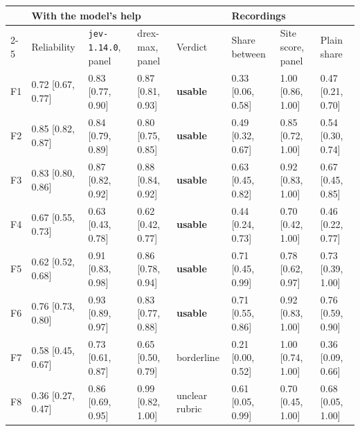 {\scriptsize\setlength{\tabcolsep}{3.2pt}
\begin{tabular}{@{}l l l l l l l l@{}}
\toprule
 & \multicolumn{4}{l}{With the model's help} & \multicolumn{3}{l}{Recordings} \\
\cmidrule(r){2-5}\cmidrule{6-8}
 & Reliability & \texttt{jev-1.14.0}, panel & drex-max, panel & Verdict & Share between & Site score, panel & Plain share \\
\midrule
F1 & 0.72 {\scriptsize[0.67, 0.77]} & 0.83 {\scriptsize[0.77, 0.90]} & 0.87 {\scriptsize[0.81, 0.93]} & \textbf{usable} & 0.33 {\scriptsize[0.06, 0.58]} & 1.00 {\scriptsize[0.86, 1.00]} & 0.47 {\scriptsize[0.21, 0.70]} \\
F2 & 0.85 {\scriptsize[0.82, 0.87]} & 0.84 {\scriptsize[0.79, 0.89]} & 0.80 {\scriptsize[0.75, 0.85]} & \textbf{usable} & 0.49 {\scriptsize[0.32, 0.67]} & 0.85 {\scriptsize[0.72, 1.00]} & 0.54 {\scriptsize[0.30, 0.74]} \\
F3 & 0.83 {\scriptsize[0.80, 0.86]} & 0.87 {\scriptsize[0.82, 0.92]} & 0.88 {\scriptsize[0.84, 0.92]} & \textbf{usable} & 0.63 {\scriptsize[0.45, 0.82]} & 0.92 {\scriptsize[0.83, 1.00]} & 0.67 {\scriptsize[0.45, 0.85]} \\
F4 & 0.67 {\scriptsize[0.55, 0.73]} & 0.63 {\scriptsize[0.43, 0.78]} & 0.62 {\scriptsize[0.42, 0.77]} & \textbf{usable} & 0.44 {\scriptsize[0.24, 0.73]} & 0.70 {\scriptsize[0.42, 1.00]} & 0.46 {\scriptsize[0.22, 0.77]} \\
F5 & 0.62 {\scriptsize[0.52, 0.68]} & 0.91 {\scriptsize[0.83, 0.98]} & 0.86 {\scriptsize[0.78, 0.94]} & \textbf{usable} & 0.71 {\scriptsize[0.45, 0.99]} & 0.78 {\scriptsize[0.62, 0.97]} & 0.73 {\scriptsize[0.39, 1.00]} \\
F6 & 0.76 {\scriptsize[0.73, 0.80]} & 0.93 {\scriptsize[0.89, 0.97]} & 0.83 {\scriptsize[0.77, 0.88]} & \textbf{usable} & 0.71 {\scriptsize[0.55, 0.86]} & 0.92 {\scriptsize[0.83, 1.00]} & 0.76 {\scriptsize[0.59, 0.90]} \\
F7 & 0.58 {\scriptsize[0.45, 0.67]} & 0.73 {\scriptsize[0.61, 0.87]} & 0.65 {\scriptsize[0.50, 0.79]} & borderline & 0.21 {\scriptsize[0.00, 0.52]} & 1.00 {\scriptsize[0.74, 1.00]} & 0.36 {\scriptsize[0.09, 0.66]} \\
F8 & 0.36 {\scriptsize[0.27, 0.47]} & 0.86 {\scriptsize[0.69, 0.95]} & 0.99 {\scriptsize[0.82, 1.00]} & unclear rubric & 0.61 {\scriptsize[0.05, 0.99]} & 0.70 {\scriptsize[0.45, 1.00]} & 0.68 {\scriptsize[0.05, 1.00]} \\
\bottomrule
\end{tabular}}

